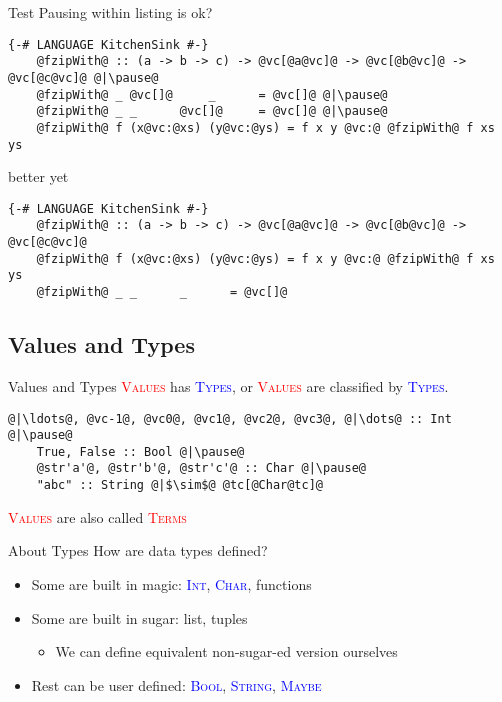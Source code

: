 \documentclass[xcolor={usenames,dvipsnames}]{beamer}
\newcommand{\htycon}[1]{\textcolor{Blue}{\textsc{#1}}}
\newcommand{\hvalcon}[1]{\textcolor{Red}{\textsc{#1}}}
\begin{document}
\begin{frame}[fragile]{Test}
  Pausing within listing is ok?

  \begin{lstlisting}[style=hask]
    {-# LANGUAGE KitchenSink #-}
    @fzipWith@ :: (a -> b -> c) -> @vc[@a@vc]@ -> @vc[@b@vc]@ -> @vc[@c@vc]@ @|\pause@
    @fzipWith@ _ @vc[]@     _      = @vc[]@ @|\pause@
    @fzipWith@ _ _      @vc[]@     = @vc[]@ @|\pause@
    @fzipWith@ f (x@vc:@xs) (y@vc:@ys) = f x y @vc:@ @fzipWith@ f xs ys
  \end{lstlisting}

  better yet

  \begin{lstlisting}[style=hask]
    {-# LANGUAGE KitchenSink #-}
    @fzipWith@ :: (a -> b -> c) -> @vc[@a@vc]@ -> @vc[@b@vc]@ -> @vc[@c@vc]@
    @fzipWith@ f (x@vc:@xs) (y@vc:@ys) = f x y @vc:@ @fzipWith@ f xs ys
    @fzipWith@ _ _      _      = @vc[]@
  \end{lstlisting}
\end{frame}


\subsection{Values and Types}

\begin{frame}[fragile]{Values and Types}
  \hvalcon{Values} has \htycon{Types}, or \hvalcon{Values} are classified by \htycon{Types}.\\

  \begin{lstlisting}[style=hask]
    @|\ldots@, @vc-1@, @vc0@, @vc1@, @vc2@, @vc3@, @|\dots@ :: Int @|\pause@
    True, False :: Bool @|\pause@
    @str'a'@, @str'b'@, @str'c'@ :: Char @|\pause@
    "abc" :: String @|$\sim$@ @tc[@Char@tc]@

  \end{lstlisting}

  \tiny{\hvalcon{Values} are also called \hvalcon{Terms}}
\end{frame}

\begin{frame}[fragile]{About Types}
  How are data types defined?\\
  \pause
  \begin{itemize}
    \item Some are built in magic: \htycon{Int}, \htycon{Char}, functions
    \pause
    \item Some are built in sugar: list, tuples
      \begin{itemize}
        \item We can define equivalent non-sugar-ed version ourselves
      \end{itemize}
    \pause
    \item Rest can be user defined: \htycon{Bool}, \htycon{String}, \htycon{Maybe}
  \end{itemize}
\end{frame}
\end{document}
